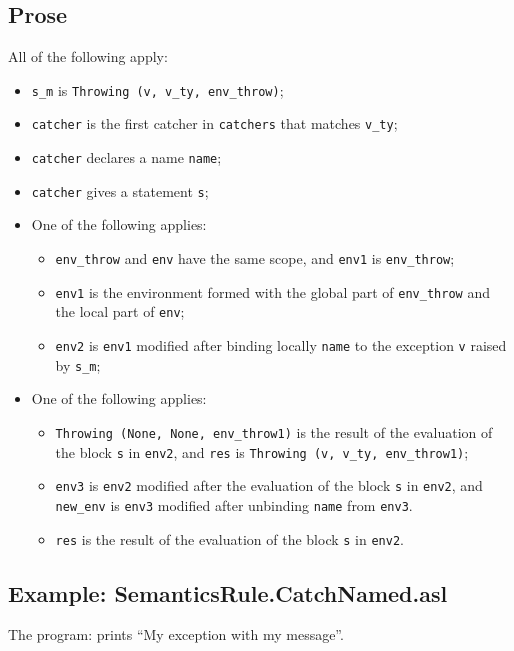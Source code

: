 \documentclass{book}
\begin{document}
    \subsection{Prose}
    All of the following apply:
    \begin{itemize}
    \item \texttt{s\_m} is \texttt{Throwing (v, v\_ty, env\_throw)};
    \item \texttt{catcher} is the first catcher in \texttt{catchers} that matches \texttt{v\_ty};
    \item \texttt{catcher} declares a name \texttt{name};
    \item \texttt{catcher} gives a statement \texttt{s};
    \item One of the following applies:
      \begin{itemize}
      \item \texttt{env\_throw} and \texttt{env} have the same scope, and \texttt{env1} is \texttt{env\_throw};
      \item \texttt{env1} is the environment formed with the global part of \texttt{env\_throw}
        and the local part of \texttt{env};
      \item \texttt{env2} is \texttt{env1} modified after binding locally \texttt{name} to the exception
        \texttt{v} raised by \texttt{s\_m};
      \end{itemize}
    \item One of the following applies:
      \begin{itemize}
      \item \texttt{Throwing (None, None, env\_throw1)} is the result of the evaluation of
        the block \texttt{s} in \texttt{env2}, and \texttt{res} is \texttt{Throwing (v, v\_ty, env\_throw1)};
      \item \texttt{env3} is \texttt{env2} modified after the evaluation of the block \texttt{s} in
        \texttt{env2}, and \texttt{new\_env} is \texttt{env3} modified after unbinding \texttt{name} from
        \texttt{env3}.
      \item \texttt{res} is the result of the evaluation of the block \texttt{s} in \texttt{env2}.
      \end{itemize}
    \end{itemize}

    \subsection{Example: SemanticsRule.CatchNamed.asl}
    The program:
    prints ``My exception with my message''.
\end{document}
